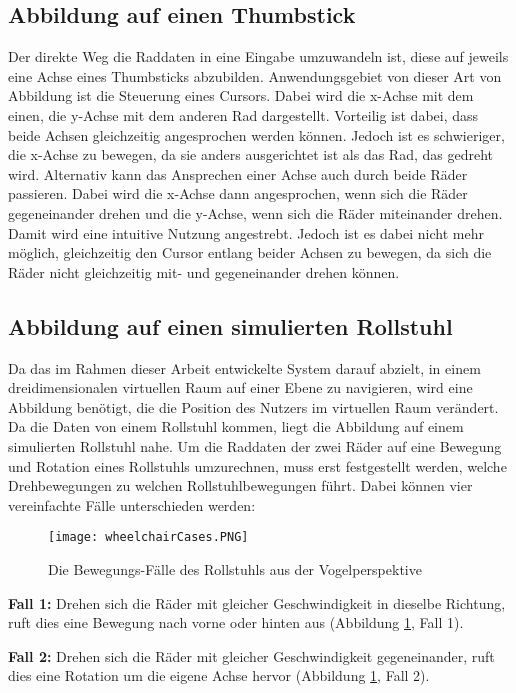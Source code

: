 \subsection{Abbildung auf einen Thumbstick}
Der direkte Weg die Raddaten in eine Eingabe umzuwandeln ist, diese auf jeweils eine Achse eines Thumbsticks abzubilden.
Anwendungsgebiet von dieser Art von Abbildung ist die Steuerung eines Cursors.
Dabei wird die x-Achse mit dem einen, die y-Achse mit dem anderen Rad dargestellt.
Vorteilig ist dabei, dass beide Achsen gleichzeitig angesprochen werden können.
Jedoch ist es schwieriger, die x-Achse zu bewegen, da sie anders ausgerichtet ist als das Rad, das gedreht wird.
Alternativ kann das Ansprechen einer Achse auch durch beide Räder passieren.
Dabei wird die x-Achse dann angesprochen, wenn sich die Räder gegeneinander drehen und die y-Achse, wenn sich die Räder miteinander drehen.
Damit wird eine intuitive Nutzung angestrebt.
Jedoch ist es dabei nicht mehr möglich, gleichzeitig den Cursor entlang beider Achsen zu bewegen, da sich die Räder nicht gleichzeitig mit- und gegeneinander drehen können.

\subsection{Abbildung auf einen simulierten Rollstuhl}
Da das im Rahmen dieser Arbeit entwickelte System darauf abzielt, in einem dreidimensionalen virtuellen Raum auf einer Ebene zu navigieren, wird eine Abbildung benötigt, die die Position des Nutzers im virtuellen Raum verändert.
Da die Daten von einem Rollstuhl kommen, liegt die Abbildung auf einem simulierten Rollstuhl nahe.
Um die Raddaten der zwei Räder auf eine Bewegung und Rotation eines Rollstuhls umzurechnen, muss erst festgestellt werden, welche Drehbewegungen zu welchen Rollstuhlbewegungen führt.
Dabei können vier vereinfachte Fälle unterschieden werden:

\begin{figure}[h]
    \centering
    \texttt{[image: wheelchairCases.PNG]}
    \caption{Die Bewegungs-Fälle des Rollstuhls aus der Vogelperspektive}
    \label{fig:wheelchairCases}
\end{figure}

\textbf{Fall 1:} Drehen sich die Räder mit gleicher Geschwindigkeit in dieselbe Richtung, ruft dies eine Bewegung nach vorne oder hinten aus (Abbildung \ref{fig:wheelchairCases}, Fall 1).

\textbf{Fall 2:} Drehen sich die Räder mit gleicher Geschwindigkeit gegeneinander, ruft dies eine Rotation um die eigene Achse hervor (Abbildung \ref{fig:wheelchairCases}, Fall 2).

